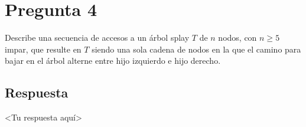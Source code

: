 \section*{Pregunta 4}
\noindent Describe una secuencia de accesos a un árbol splay $T$ de $n$ nodos, con $n \geq 5$ impar, que resulte en $T$ siendo una sola cadena de nodos en la que el camino para bajar en el árbol alterne entre hijo izquierdo e hijo derecho.

\subsection*{Respuesta}

<Tu respuesta aquí>

\bigskip
